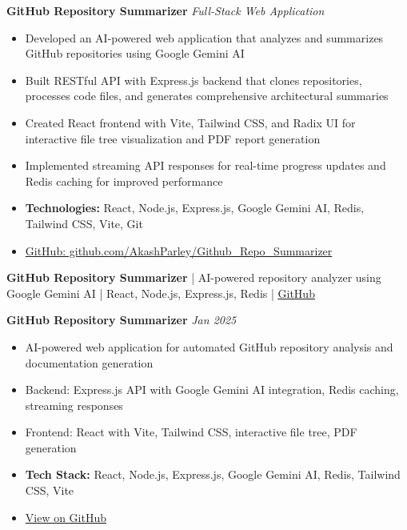 
\textbf{GitHub Repository Summarizer} \hfill \textit{Full-Stack Web Application}
\begin{itemize}[leftmargin=*, nosep]
    \item Developed an AI-powered web application that analyzes and summarizes GitHub repositories using Google Gemini AI
    \item Built RESTful API with Express.js backend that clones repositories, processes code files, and generates comprehensive architectural summaries
    \item Created React frontend with Vite, Tailwind CSS, and Radix UI for interactive file tree visualization and PDF report generation
    \item Implemented streaming API responses for real-time progress updates and Redis caching for improved performance
    \item \textbf{Technologies:} React, Node.js, Express.js, Google Gemini AI, Redis, Tailwind CSS, Vite, Git
    \item \href{https://github.com/AkashParley/Github_Repo_Summarizer}{GitHub: github.com/AkashParley/Github_Repo_Summarizer}
\end{itemize}


\textbf{GitHub Repository Summarizer} | AI-powered repository analyzer using Google Gemini AI | React, Node.js, Express.js, Redis | \href{https://github.com/AkashParley/Github_Repo_Summarizer}{GitHub}

\textbf{GitHub Repository Summarizer} \hfill \textit{Jan 2025}
\begin{itemize}[leftmargin=*, nosep]
    \item AI-powered web application for automated GitHub repository analysis and documentation generation
    \item Backend: Express.js API with Google Gemini AI integration, Redis caching, streaming responses
    \item Frontend: React with Vite, Tailwind CSS, interactive file tree, PDF generation
    \item \textbf{Tech Stack:} React, Node.js, Express.js, Google Gemini AI, Redis, Tailwind CSS, Vite
    \item \href{https://github.com/AkashParley/Github_Repo_Summarizer}{View on GitHub}
\end{itemize}

